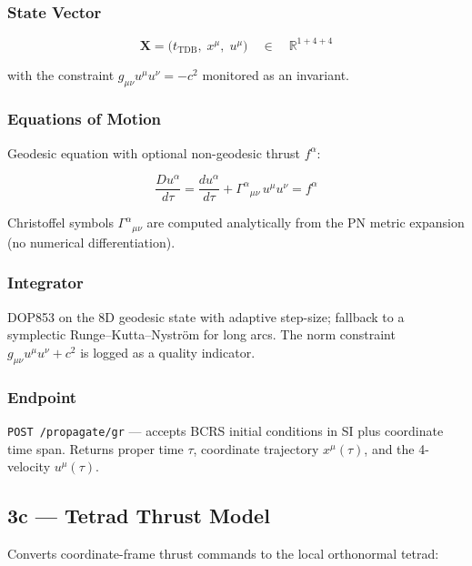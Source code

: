 \documentclass[11pt, a4paper]{article}
\begin{document}
\subsubsection{State Vector}

\begin{equation}
  \mathbf{X} = \bigl(t_\text{TDB},\; x^\mu,\; u^\mu\bigr)
  \quad\in\quad \mathbb{R}^{1+4+4}
\end{equation}

with the constraint $g_{\mu\nu} u^\mu u^\nu = -c^2$ monitored as an invariant.

\subsubsection{Equations of Motion}

Geodesic equation with optional non-geodesic thrust $f^\alpha$:

\begin{equation}
  \frac{Du^\alpha}{d\tau}
  = \frac{du^\alpha}{d\tau}
    + \Gamma^\alpha{}_{\mu\nu}\, u^\mu u^\nu
  = f^\alpha
\end{equation}

Christoffel symbols $\Gamma^\alpha{}_{\mu\nu}$ are computed analytically from
the PN metric expansion (no numerical differentiation).

\subsubsection{Integrator}

DOP853 on the 8D geodesic state with adaptive step-size; fallback to a
symplectic Runge--Kutta--Nyström for long arcs. The norm constraint
$g_{\mu\nu}u^\mu u^\nu + c^2$ is logged as a quality indicator.

\subsubsection{Endpoint}

\texttt{POST /propagate/gr} — accepts BCRS initial conditions in SI plus
coordinate time span. Returns proper time $\tau$, coordinate trajectory
$x^\mu(\tau)$, and the 4-velocity $u^\mu(\tau)$.

\subsection{3c — Tetrad Thrust Model}

Converts coordinate-frame thrust commands to the local orthonormal tetrad:
\end{document}
